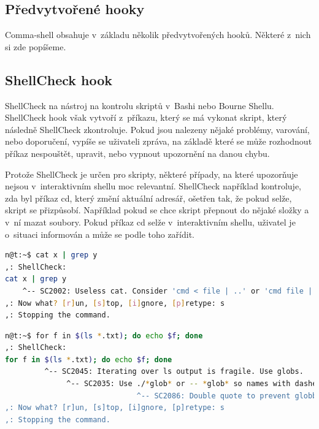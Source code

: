 \documentclass[thesis=M,czech]{FITthesis}[2012/06/26]
\begin{document}
\subsection{Předvytvořené hooky}

Comma-shell obsahuje v~základu několik předvytvořených hooků. Některé z~nich si zde popíšeme.


%
\subsection{ShellCheck hook}

ShellCheck na nástroj na kontrolu skriptů v~Bashi nebo Bourne Shellu. ShellCheck hook však vytvoří z~příkazu, který se má vykonat skript, který následně ShellCheck zkontroluje. Pokud jsou nalezeny nějaké problémy, varování, nebo doporučení, vypíše se uživateli zpráva, na základě které se může rozhodnout příkaz nespouštět, upravit, nebo vypnout upozornění na danou chybu.

Protože ShellCheck je určen pro skripty, některé případy, na které upozorňuje nejsou v~interaktivním shellu moc relevantní. ShellCheck například kontroluje, zda byl příkaz cd, který změní aktuální adresář, ošetřen tak, že pokud selže, skript se přizpůsobí. Například pokud se chce skript přepnout do nějaké složky a v~ní mazat soubory. Pokud příkaz cd selže v~interaktivním shellu, uživatel je o~situaci informován a může se podle toho zařídit.

\begin{minipage}{\linewidth}
\begin{lstlisting}[language=bash, caption={ShellCheck}, label={lst:sccat}]
n@t:~$ cat x | grep y
,: ShellCheck:
cat x | grep y
    ^-- SC2002: Useless cat. Consider 'cmd < file | ..' or 'cmd file | ..' instead.
,: Now what? [r]un, [s]top, [i]gnore, [p]retype: s
,: Stopping the command.
\end{lstlisting}
\end{minipage}


\begin{minipage}{\linewidth}
\begin{lstlisting}[language=bash, caption={ShellCheck}, label={lst:csfor}]
n@t:~$ for f in $(ls *.txt); do echo $f; done
,: ShellCheck:
for f in $(ls *.txt); do echo $f; done
         ^-- SC2045: Iterating over ls output is fragile. Use globs.
              ^-- SC2035: Use ./*glob* or -- *glob* so names with dashes won't become options.
                              ^-- SC2086: Double quote to prevent globbing and word splitting.
,: Now what? [r]un, [s]top, [i]gnore, [p]retype: s
,: Stopping the command.

\end{lstlisting}
\end{minipage}
\end{document}
